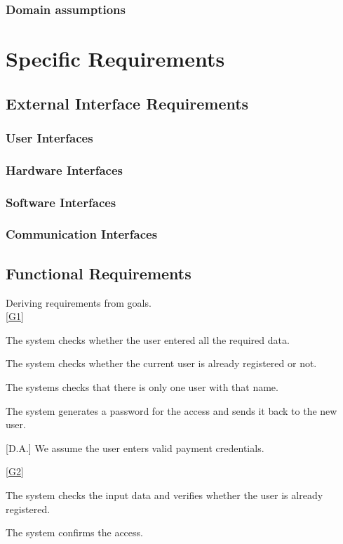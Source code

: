 \documentclass[11pt,a4paper]{report}
\begin{document}
\subsection{Domain assumptions}
\chapter{Specific Requirements}
\section{External Interface Requirements}
\subsection{User Interfaces}
\subsection{Hardware Interfaces}
\subsection{Software Interfaces}
\subsection{Communication Interfaces}
\section{Functional Requirements}
Deriving requirements from goals.\\

	\ref{G1} \\
	\begin{Req}
		\item The system checks whether the user entered all the required data.
		\item	The system checks whether the current user is already registered or not.
		\item The systems checks that there is only one user with that name.
		\item The system generates a password for the access and sends it back to the new user.
	\end{Req}
	[D.A.] We assume the user enters valid payment credentials.
	
	\ref{G2} \\
	\begin{Req}[resume]
		\item The system checks the input data and verifies whether the user is already registered.
		\item The system confirms the access.
	\end{Req}
	
\end{document}
